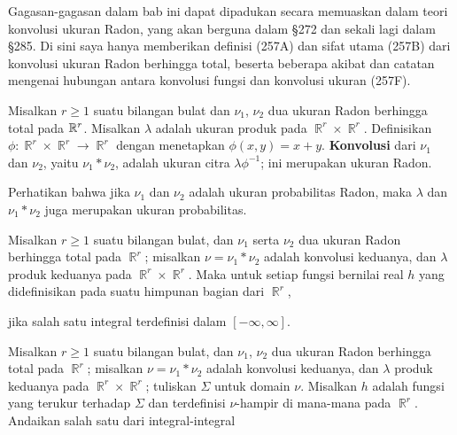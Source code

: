 
\def\chaptername{Ukuran produk}
\def\sectionname{Konvolusi ukuran}


Gagasan-gagasan dalam bab ini dapat dipadukan secara memuaskan dalam
teori konvolusi ukuran Radon,
yang akan berguna dalam \S272 dan sekali lagi dalam
\S285.   Di sini saya hanya memberikan definisi (257A) dan sifat utama
(257B) dari konvolusi ukuran Radon berhingga total, beserta beberapa
akibat dan catatan mengenai hubungan antara konvolusi fungsi
dan konvolusi ukuran (257F).

  Misalkan $r\ge 1$ suatu
bilangan bulat dan $\nu_1$, $\nu_2$ dua ukuran Radon berhingga total pada
$\Bbb R^r$.   Misalkan $\lambda$ adalah ukuran produk pada
$\BbbR^r\times\BbbR^r$.   Definisikan
$\phi:\BbbR^r\times\BbbR^r\to\BbbR^r$ dengan menetapkan
$\phi(x,y)=x+y$.   {\bf Konvolusi}
dari $\nu_1$ dan $\nu_2$, yaitu $\nu_1*\nu_2$, adalah ukuran citra
$\lambda\phi^{-1}$;   ini merupakan ukuran Radon.

Perhatikan bahwa jika $\nu_1$ dan $\nu_2$ adalah ukuran probabilitas Radon, maka
$\lambda$ dan $\nu_1*\nu_2$ juga merupakan ukuran probabilitas.

 Misalkan $r\ge 1$ suatu bilangan bulat, dan $\nu_1$ serta
$\nu_2$ dua ukuran Radon berhingga total pada $\BbbR^r$;  misalkan
$\nu=\nu_1*\nu_2$ adalah konvolusi keduanya, dan $\lambda$ produk keduanya pada
$\BbbR^r\times\BbbR^r$.   Maka untuk setiap fungsi bernilai real $h$ yang didefinisikan
pada suatu himpunan bagian dari $\BbbR^r$,


\noindent jika salah satu integral terdefinisi dalam $[-\infty,\infty]$.


 Misalkan $r\ge 1$ suatu bilangan bulat, dan $\nu_1$,
$\nu_2$ dua ukuran Radon berhingga total pada $\BbbR^r$;  misalkan
$\nu=\nu_1*\nu_2$ adalah konvolusi keduanya, dan $\lambda$ produk keduanya pada
$\BbbR^r\times\BbbR^r$;  tuliskan $\Sigma$ untuk domain $\nu$.
Misalkan $h$ adalah fungsi yang terukur terhadap $\Sigma$
dan terdefinisi $\nu$-hampir di mana-mana pada $\BbbR^r$.     Andaikan salah
satu dari integral-integral

